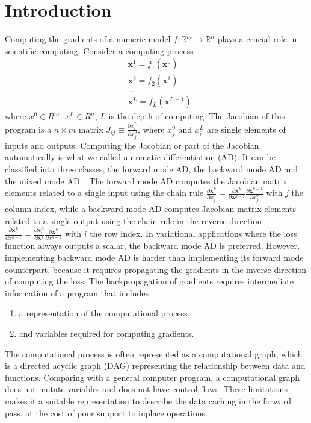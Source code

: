 \documentclass{article}
\newcommand{\<}{\langle}
\renewcommand{\>}{\rangle}
\newcommand{\vx}{{\mathbf{x}}}
\theoremstyle{definition}\newtheorem{definition}{\textit{Definition}}
\begin{document}
\section{Introduction}\label{sec:intro}
    Computing the gradients of a numeric model $f : \mathbb{R}^m \rightarrow \mathbb{R}^n$ plays a crucial role in scientific computing. Consider a computing process
\begin{align*}
    &\vx^1 = f_1(\vx^0)\\
    &\vx^2 = f_2(\vx^1)\\
    &\ldots\\
    &\vx^L = f_L(\vx^{L-1})
\end{align*}
where $x^0\in R^m$, $x^L\in R^n$, $L$ is the depth of computing.
The Jacobian of this program is a $n\times m$ matrix $J_{ij} \equiv \frac{\partial x^L_i}{\partial x_j^0}$, where $x_j^0$ and $x_i^L$ are single elements of inputs and outputs.
Computing the Jacobian or part of the Jacobian automatically is what we called automatic differentiation (AD). It can be classified into three classes, the forward mode AD, the backward mode AD and the mixed mode AD.~\cite{Hascoet2013}
    The forward mode AD computes the Jacobian matrix elements related to a single input using the chain rule $\frac{\partial \vx^k}{\partial x^0_j} = \frac{\partial \vx^k}{\partial \vx^{k-1}}\frac{\partial \vx^{k-1}}{\partial x^0_j}$ with $j$ the column index, while a backward mode AD computes Jacobian matrix elements related to a single output using the chain rule in the reverse direction $\frac{\partial \vx^L_i}{\partial x^{k-1}} = \frac{\partial \vx^L_i}{\partial \vx^{k}}\frac{\partial \vx^{k}}{\partial x^{k-1}}$ with $i$ the row index.
    In variational applications where the loss function always outputs a scalar, the backward mode AD is preferred.
However, implementing backward mode AD is harder than implementing its forward mode counterpart, because it requires propagating the gradients in the inverse direction of computing the loss. The backpropagation of gradients requires intermediate information of a program that includes
\begin{enumerate}
    \item a representation of the computational process,
    \item and variables required for computing gradients.
\end{enumerate}
    The computational process is often represented as a computational graph, which is a directed acyclic graph (DAG) representing the relationship between data and functions. Comparing with a general computer program, a computational graph does not mutate variables and does not have control flows. These limitations makes it a suitable representation to describe the data caching in the forward pass, at the cost of poor support to inplace operations.
\end{document}
